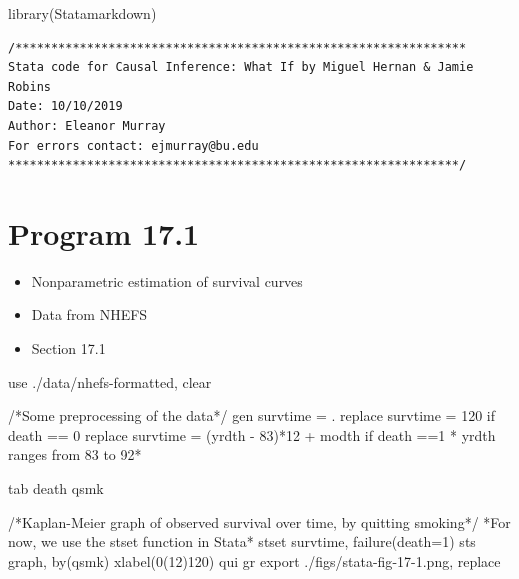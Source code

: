 \documentclass[
  10pt,
  a4paper,
]{book}
\newenvironment{Shaded}{\begin{snugshade}}{\end{snugshade}}
\newcommand{\CommentTok}[1]{\textcolor[rgb]{0.37,0.37,0.37}{#1}}
\newcommand{\FunctionTok}[1]{\textcolor[rgb]{0.28,0.35,0.67}{#1}}
\newcommand{\KeywordTok}[1]{\textcolor[rgb]{0.00,0.46,0.62}{#1}}
\newcommand{\NormalTok}[1]{\textcolor[rgb]{0.00,0.46,0.62}{#1}}
\providecommand{\tightlist}{%
  \setlength{\itemsep}{0pt}\setlength{\parskip}{0pt}}
\begin{document}
\begin{Shaded}
\begin{Highlighting}[]
\FunctionTok{library}\NormalTok{(Statamarkdown)}
\end{Highlighting}
\end{Shaded}

\begin{verbatim}
/***************************************************************
Stata code for Causal Inference: What If by Miguel Hernan & Jamie Robins
Date: 10/10/2019
Author: Eleanor Murray 
For errors contact: ejmurray@bu.edu
***************************************************************/
\end{verbatim}

\hypertarget{program-17.1-1}{%
\section{Program 17.1}\label{program-17.1-1}}

\begin{itemize}
\tightlist
\item
  Nonparametric estimation of survival curves
\item
  Data from NHEFS
\item
  Section 17.1
\end{itemize}

\begin{Shaded}
\begin{Highlighting}[]
\KeywordTok{use}\NormalTok{ ./}\KeywordTok{data}\NormalTok{/nhefs{-}formatted, }\KeywordTok{clear}

\CommentTok{/*Some preprocessing of the data*/}
\KeywordTok{gen}\NormalTok{ survtime = .}
\KeywordTok{replace}\NormalTok{ survtime = 120 }\KeywordTok{if}\NormalTok{ death == 0}
\KeywordTok{replace}\NormalTok{ survtime = (yrdth {-} 83)*12 + modth }\KeywordTok{if}\NormalTok{ death ==1}
\NormalTok{* yrdth ranges from 83 to 92*}

\KeywordTok{tab}\NormalTok{ death qsmk}

\CommentTok{/*Kaplan{-}Meier graph of observed survival over time, by quitting smoking*/}
\NormalTok{*For now, we }\KeywordTok{use}\NormalTok{ the }\KeywordTok{stset} \KeywordTok{function} \KeywordTok{in}\NormalTok{ Stata*}
\KeywordTok{stset}\NormalTok{ survtime, failure(death=1)}
\KeywordTok{sts} \KeywordTok{graph}\NormalTok{, }\KeywordTok{by}\NormalTok{(qsmk) }\KeywordTok{xlabel}\NormalTok{(0(12)120)}
\KeywordTok{qui} \KeywordTok{gr} \KeywordTok{export}\NormalTok{ ./figs/stata{-}fig{-}17{-}1.png, }\KeywordTok{replace}
\end{Highlighting}
\end{Shaded}
\end{document}
